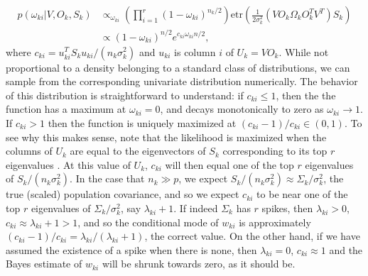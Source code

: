 \documentclass[12pt]{article}
\newcommand{\bl}[1]{{\mathbf #1}}
\newcommand{\etr}{\text{etr}}
\begin{document}
\begin{align}
p(\omega_{ki}|V, O_k, S_k) &\propto_{\omega_{ki}}
  \left(\prod_{i=1}^r(1-\omega_{ki})^{n_k/2}  \right)
  \etr(\frac{1}{2\sigma_k^2}(VO_k\Omega_kO_k^TV^T)S_k) \\
&  \propto  (1-\omega_{ki})^{n/2} e^{c_{ki} \omega_{ki}  n/2},    
\label{eqn:wpost}
\end{align}
%
\noindent where $c_{ki} = u_{ki}^T S_k u_{ki}/(n_k \sigma^2_k)$ and $ u_{ki}$ is
column $i$ of $U_k = VO_k$.  While not proportional to a density
belonging to a standard class of distributions, we can sample from the
corresponding univariate distribution numerically.  The behavior of
this distribution is straightforward to understand: if $c_{ki}\leq 1$, then
the the function has a maximum at $\omega_{ki} =0$, and decays
monotonically to zero as $\omega_{ki} \rightarrow 1$.  If $c_{ki}>1$ then the
function is uniquely maximized at $(c_{ki}-1)/c_{ki} \in (0,1)$.  To see why
this makes sense, note that the likelihood is maximized when the
columns of $ U_k$ are equal to the eigenvectors of $S_k$
corresponding to its top $r$ eigenvalues
\citep{Tipping1999}. At this value of $U_k$, $c_{ki}$ will then
equal one of the top $r$ eigenvalues of $ S_k/(n_k\sigma_k^2)$.  In the
case that $n_k\gg p$, we expect
$ S_k/(n_k\sigma_k^2)\approx \Sigma_k/\sigma_k^2$, the true (scaled)
population covariance, and so we expect $c_{ki}$ to be near one of the top
$r$ eigenvalues of $\Sigma_k/\sigma^2_k$, say $\lambda_{ki}+1$.  If indeed
$\Sigma_k$ has $r$ spikes, then $\lambda_{ki}>0$,
$c_{ki} \approx \lambda_{ki} +1 > 1$, and so the conditional mode of $w_{ki}$ is
approximately $(c_{ki}-1)/c_{ki} = \lambda_{ki}/(\lambda_{ki}+1)$, the correct value.
On the other hand, if we have assumed the existence of a spike when
there is none, then $\lambda_{ki}=0$, $c_{ki}\approx 1$ and the Bayes estimate
of $w_{ki}$ will be shrunk towards zero, as it should be.





\end{document}
